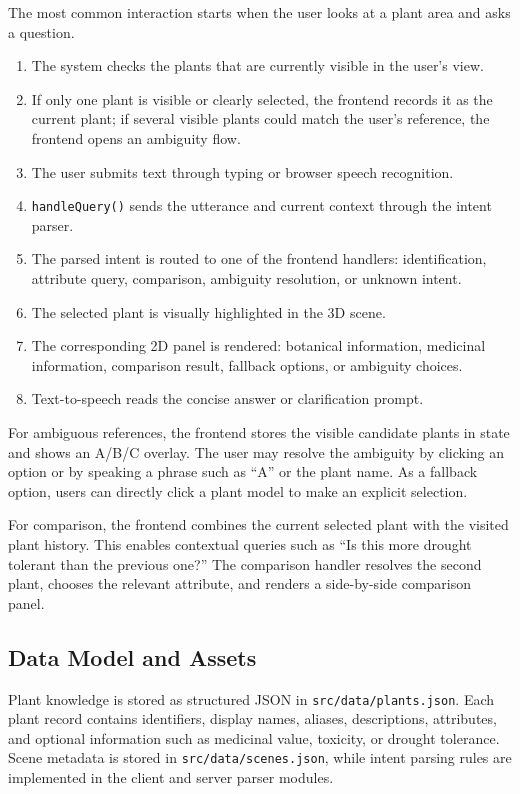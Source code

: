 \documentclass[12pt,a4paper]{article}
\begin{document}
The most common interaction starts when the user looks at a plant area and asks
a question.

\begin{enumerate}[label=\arabic*.]
    \item The system checks the plants that are currently visible in the user's
    view.
    \item If only one plant is visible or clearly selected, the frontend records
    it as the current plant; if several visible plants could match the user's
    reference, the frontend opens an ambiguity flow.
    \item The user submits text through typing or browser speech recognition.
    \item \texttt{handleQuery()} sends the utterance and current context through
    the intent parser.
    \item The parsed intent is routed to one of the frontend handlers:
    identification, attribute query, comparison, ambiguity resolution, or
    unknown intent.
    \item The selected plant is visually highlighted in the 3D scene.
    \item The corresponding 2D panel is rendered: botanical information,
    medicinal information, comparison result, fallback options, or ambiguity
    choices.
    \item Text-to-speech reads the concise answer or clarification prompt.
\end{enumerate}

For ambiguous references, the frontend stores the visible candidate plants in
state and shows an A/B/C overlay. The user may resolve the ambiguity by clicking
an option or by speaking a phrase such as ``A'' or the plant name. As a fallback
option, users can directly click a plant model to make an explicit selection.

For comparison, the frontend combines the current selected plant with the
visited plant history. This enables contextual queries such as ``Is this more
drought tolerant than the previous one?'' The comparison handler resolves the
second plant, chooses the relevant attribute, and renders a side-by-side
comparison panel.

\subsection{Data Model and Assets}

Plant knowledge is stored as structured JSON in \texttt{src/data/plants.json}.
Each plant record contains identifiers, display names, aliases, descriptions,
attributes, and optional information such as medicinal value, toxicity, or
drought tolerance. Scene metadata is stored in \texttt{src/data/scenes.json},
while intent parsing rules are implemented in the client and server parser
modules.
\end{document}
